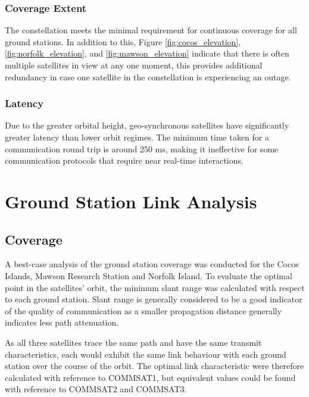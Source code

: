 \documentclass[12pt]{article}
\begin{document}
\subsubsection{Coverage Extent}
    The constellation meets the minimal requirement for continuous coverage for all ground stations. In addition to this, Figure \ref{fig:cocos_elevation}, \ref{fig:norfolk_elevation}, and \ref{fig:mawson_elevation} indicate that there is often multiple satellites in view at any one moment, this provides additional redundancy in case one satellite in the constellation is experiencing an outage. 

\subsubsection{Latency}
    Due to the greater orbital height, geo-synchronous satellites have significantly greater latency than lower orbit regimes. The minimum time taken for a communication round trip is around 250 ms, making it ineffective for some communication protocols that require near real-time interactions.


\section{Ground Station Link Analysis}

\subsection{Coverage}
A best-case analysis of the ground station coverage was conducted for the Cocos Islands, Mawson Research Station and Norfolk Island. To evaluate the optimal point in the satellites' orbit, the minimum slant range was calculated with respect to each ground station. Slant range is generally considered to be a good indicator of the quality of communication as a smaller propagation distance generally indicates less path attenuation. 

As all three satellites trace the same path and have the same transmit characteristics, each would exhibit the same link behaviour with each ground station over the course of the orbit. The optimal link characteristic were therefore calculated with reference to COMMSAT1, but equivalent values could be found with reference to COMMSAT2 and COMMSAT3. 
\end{document}
